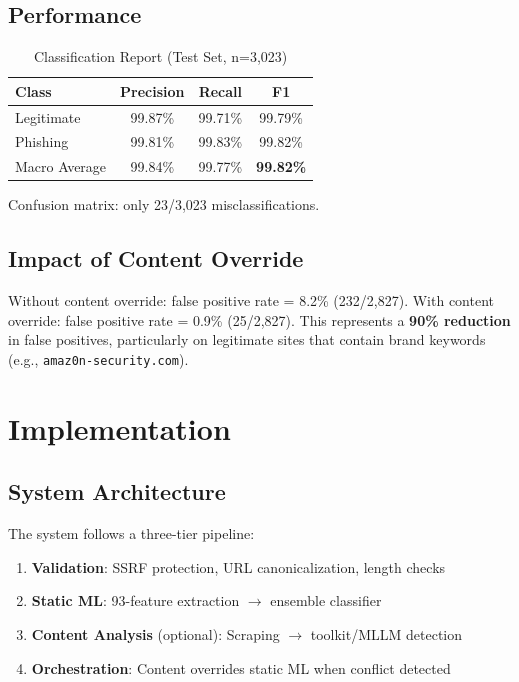 \documentclass[10pt, conference]{IEEEtran}
\begin{document}
\subsection{Performance}
\begin{table}[h]
    \centering
    \caption{Classification Report (Test Set, n=3,023)}
    \label{tab:results}
    \begin{tabular}{@{}lccc@{}}
        \toprule
        Class & Precision & Recall & F1 \\
        \midrule
        Legitimate & 99.87\% & 99.71\% & 99.79\% \\
        Phishing & 99.81\% & 99.83\% & 99.82\% \\
        Macro Average & 99.84\% & 99.77\% & \textbf{99.82\%} \\
        \bottomrule
    \end{tabular}
\end{table}

Confusion matrix: only 23/3,023 misclassifications.

\subsection{Impact of Content Override}
Without content override: false positive rate = 8.2\% (232/2,827). With content override: false positive rate = 0.9\% (25/2,827). This represents a \textbf{90\% reduction} in false positives, particularly on legitimate sites that contain brand keywords (e.g., \texttt{amaz0n-security.com}).

\section{Implementation}

\subsection{System Architecture}
The system follows a three-tier pipeline:
\begin{enumerate}
    \item \textbf{Validation}: SSRF protection, URL canonicalization, length checks
    \item \textbf{Static ML}: 93-feature extraction $\rightarrow$ ensemble classifier
    \item \textbf{Content Analysis} (optional): Scraping $\rightarrow$ toolkit/MLLM detection
    \item \textbf{Orchestration}: Content overrides static ML when conflict detected
\end{enumerate}
\end{document}
